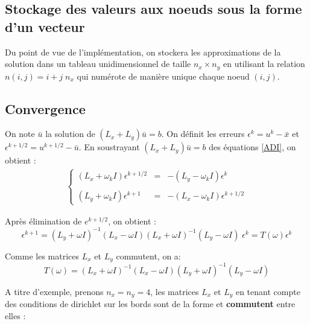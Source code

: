 \documentclass{article}
\begin{document}
\subsection{Stockage des valeurs aux noeuds sous la forme d'un vecteur}



Du point de vue de l'implémentation, on stockera les approximations de la solution dans un tableau unidimensionnel 
de taille $n_x \times n_y$ en utilisant la relation $n(i,j)=i+j\; n_x$ qui numérote de manière unique chaque noeud $(i,j)$. 


 \subsection{Convergence}
    
On note $\bar u$ la solution de $(L_x+L_y) \bar u =b$. On définit les erreurs $\epsilon^k = u^k-\bar x$ et
$\epsilon^{k+1/2}= u^{k+1/2}-\bar u$.  En soustrayant $(L_x+L_y) \bar u =b$ des équations \eqref{ADI},
on obtient :
 \begin{eqnarray}\left\{ 
\begin{array}{lcl}
  (L_x+\omega_k I) \epsilon^{k+1/2} &=& -(L_y-\omega_k I) \epsilon^k \\
  \\
 (L_y+\omega_k I) \epsilon^{k+1} &=& -(L_x-\omega_k I) \epsilon^{k+1/2}  \end{array}  \right. 
  \label{err}
  \end{eqnarray}
 
Après élimination de $e^{k+1/2}$, on obtient :
\begin{equation}
 \epsilon^{k+1} = (L_y+\omega I)^{-1}  (L_x-\omega I)  (L_x+\omega I)^{-1} (L_y-\omega I) \; \epsilon^k = T(\omega) \epsilon^k
 \label{err}
\end{equation}

Comme les matrices $L_x$ et $L_y$ commutent, on a:
\begin{equation}
T(\omega) = (L_x+\omega I)^{-1} (L_x-\omega I)   (L_y+\omega I)^{-1} (L_y-\omega I)
 \label{Tk}
\end{equation}

A titre d'exemple,  prenons $n_x=n_y=4$, les matrices $L_x$ et $L_y$
en tenant compte des conditions de dirichlet sur les bords sont de la forme et {\bf commutent} entre elles :
\end{document}
